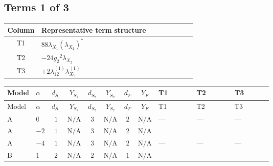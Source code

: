\documentclass[8pt]{article}
\begin{document}
\begin{landscape}
\subsection*{Terms 1 of 3}
\begin{center}
\begin{tabular}{@{}c >{\raggedright\arraybackslash}p{0.82\linewidth}@{}}
\toprule
Column & Representative term structure \\
\midrule
T1 & \(\displaystyle 88 {\lambda_{X_{1}}} \left({\lambda_{X_{2}}}\right)^{*}\) \\
\midrule
T2 & \(\displaystyle -24 {g_2}^2 {\lambda_{X_{2}}}\) \\
\midrule
T3 & \(\displaystyle +2 {\lambda_{12}^{(1)}} {\lambda_{X_{7}}^{(1)}}\) \\
\midrule
\bottomrule
\end{tabular}
\end{center}
\smallskip
\tiny
\begin{longtable}{@{}llcccccc >{\raggedright\arraybackslash}p{0.21\linewidth} >{\raggedright\arraybackslash}p{0.21\linewidth} >{\raggedright\arraybackslash}p{0.21\linewidth}@{}}
\toprule
Model & $\alpha$ & $d_{S_1}$ & $Y_{S_1}$ & $d_{S_2}$ & $Y_{S_2}$ & $d_F$ & $Y_F$ & T1 & T2 & T3 \\
\midrule
\endfirsthead
\toprule
Model & $\alpha$ & $d_{S_1}$ & $Y_{S_1}$ & $d_{S_2}$ & $Y_{S_2}$ & $d_F$ & $Y_F$ & T1 & T2 & T3 \\
\midrule
\endhead
A & $0$ & $1$ & $\text{N/A}$ & $3$ & $\text{N/A}$ & $2$ & $\text{N/A}$ & --- & --- & --- \\
\midrule
A & $-2$ & $1$ & $\text{N/A}$ & $3$ & $\text{N/A}$ & $2$ & $\text{N/A}$ & \scriptsize\adjustbox{max width=\linewidth}{$\begin{gathered} 88 {\lambda_{X_{1}}} \left({\lambda_{X_{2}}}\right)^{*}\end{gathered}$} & \scriptsize\adjustbox{max width=\linewidth}{$\begin{gathered} -24 {g_2}^2 {\lambda_{X_{2}}}\end{gathered}$} & \scriptsize\adjustbox{max width=\linewidth}{$\begin{gathered} +2 {\lambda_{12}^{(1)}} {\lambda_{X_{7}}^{(1)}}\end{gathered}$} \\
\midrule
A & $-4$ & $1$ & $\text{N/A}$ & $3$ & $\text{N/A}$ & $2$ & $\text{N/A}$ & --- & --- & --- \\
\midrule
B & $1$ & $2$ & $\text{N/A}$ & $2$ & $\text{N/A}$ & $1$ & $\text{N/A}$ & --- & --- & --- \\

\end{longtable}
\end{landscape}
\end{document}
